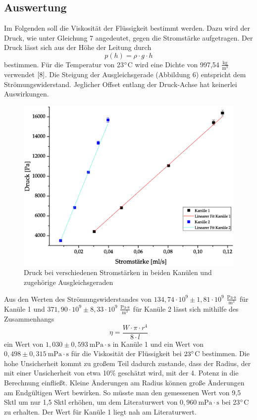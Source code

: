 \documentclass{article}
\begin{document}
\subsection{Auswertung}
Im Folgenden soll die Viskosität der Flüssigkeit bestimmt werden. Dazu wird der Druck, wie unter Gleichung 7 angedeutet, gegen die Stromstärke aufgetragen. Der Druck lässt sich aus der Höhe der Leitung durch
\begin{equation}
p(h) = \rho \cdot g \cdot h
\end{equation}
bestimmen. Für die Temperatur von 23$ \degree $C wird eine Dichte von 997,54 $\frac{\textrm{kg}}{\textrm{m}^3}$ verwendet $\cite{8}$. Die Steigung der Ausgleichsgerade (Abbildung 6) entspricht dem Strömungswiderstand. Jeglicher Offset entlang der Druck-Achse hat keinerlei Auswirkungen.
\begin{figure}[H]
\centering
\includegraphics[width=350pt]{DruckStrom.eps}
\caption{Druck bei verschiedenen Stromstärken in beiden Kanülen und zugehörige Ausgleichsgeraden}
\label{fig:length_eight_mouse}
\end{figure}
\noindent
Aus den Werten des Strömungswiderstandes von $134,74\cdot 10^9 \pm 1,81 \cdot 10^9 \   \frac{\textrm{Pa}\cdot \textrm{s}}{\textrm{m}^3}$ für Kanüle 1 und $371,90\cdot 10^9 \pm 8,33\cdot 10^9 \ \frac{\textrm{Pa}\cdot \textrm{s}}{\textrm{m}^3}$ für Kanüle 2 lässt sich mithilfe des Zusammenhangs
\begin{equation}
\eta = \frac{W\cdot\pi\cdot r^4}{8\cdot l}
\end{equation}
ein Wert von $1,030 \pm 0,593 \ \textrm{mPa} \cdot \textrm{s}$ in Kanüle 1 und ein Wert von $0,498 \pm 0,315 \ \textrm{mPa} \cdot \textrm{s}$ für die Viskosität der Flüssigkeit bei $23 \degree$C bestimmen. Die hohe Unsicherheit kommt zu großem Teil dadurch zustande, dass der Radius, der mit einer Unsicherheit von etwa 10$\%$ geschätzt wird, mit der 4. Potenz in die Berechnung einfließt. Kleine Änderungen am Radius können große Änderungen am Endgültigen Wert bewirken. So müsste man den gemessenen Wert von 9,5 Sktl um nur 1,5 Sktl erhöhen, um dem Literaturwert von $0,960 \ \textrm{mPa}\cdot \textrm{s}$ \cite{9} bei 23$ \degree$C zu erhalten. Der Wert für Kanüle 1 liegt nah am Literaturwert.
\end{document}
